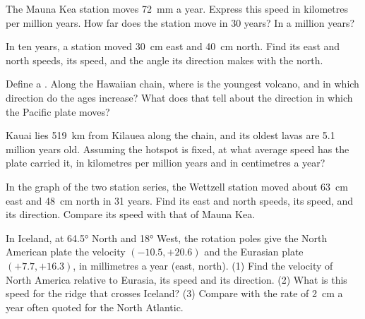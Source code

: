 \begin{exercise}[$\star$]\label{exo:g11:plate-motions:2}
The Mauna Kea station moves \qty{72}{mm} a year. Express this speed in
kilometres per million years. How far does the station move in 30 years? In
a million years?
\end{exercise}

\begin{exercise}[$\star$]\label{exo:g11:plate-motions:3}
In ten years, a station moved \qty{30}{cm} east and \qty{40}{cm} north. Find
its east and north speeds, its speed, and the angle its direction makes with
the north.
\end{exercise}

\begin{exercise}[$\star$]\label{exo:g11:plate-motions:4}
Define a . Along the Hawaiian chain, where is the youngest
volcano, and in which direction do the ages increase? What does that tell
about the direction in which the Pacific plate moves?
\end{exercise}

\begin{exercise}[$\star$]\label{exo:g11:plate-motions:5}
Kauai lies \qty{519}{km} from Kilauea along the chain, and its oldest lavas
are \num{5.1} million years old. Assuming the hotspot is fixed, at what
average speed has the plate carried it, in kilometres per million years and
in centimetres a year?
\end{exercise}

\begin{exercise}[$\star\star$]\label{exo:g11:plate-motions:6}
In the graph of the two station series, the Wettzell station moved about
\qty{63}{cm} east and \qty{48}{cm} north in 31 years. Find its east and north
speeds, its speed, and its direction. Compare its speed with that of Mauna
Kea.
\end{exercise}

\begin{exercise}[$\star\star$]\label{exo:g11:plate-motions:7}
In Iceland, at \ang{64.5} North and \ang{18} West, the rotation poles give
the North American plate the velocity $(-10.5, +20.6)$ and the Eurasian
plate $(+7.7, +16.3)$, in millimetres a year (east, north). (1) Find the
velocity of North America relative to Eurasia, its speed and its direction.
(2) What is this speed for the ridge that crosses Iceland? (3) Compare with
the rate of \qty{2}{cm} a year often quoted for the North Atlantic.
\end{exercise}

